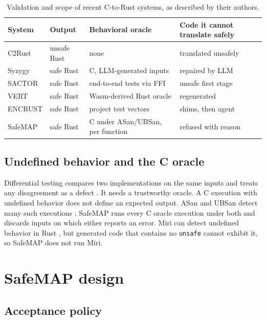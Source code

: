 \documentclass[pdflatex,sn-basic]{sn-jnl}
\newcommand{\tool}{SafeMAP\xspace}
\begin{document}
\begin{table}[t]
\centering
\caption{Validation and scope of recent C-to-Rust systems, as described by their authors.}
\label{tab:related}
\scriptsize
\begin{tabular}{@{}lp{1.3cm}p{3.2cm}p{2.9cm}@{}}
\toprule
System & Output & Behavioral oracle & Code it cannot translate safely \\
\midrule
C2Rust \citep{c2rust} & unsafe Rust & none & translated unsafely \\
Syzygy \citep{shetty2024syzygy} & safe Rust & C, LLM-generated inputs & repaired by LLM \\
SACTOR \citep{zhou2025sactor} & safe Rust & end-to-end tests via FFI & unsafe first stage \\
VERT \citep{yang2025vert} & safe Rust & Wasm-derived Rust oracle & regenerated \\
ENCRUST \citep{sim2026encrust} & safe Rust & project test vectors & shims, then agent \\
\tool & safe Rust & C under ASan/UBSan, per function & refused with reason \\
\bottomrule
\end{tabular}
\end{table}

\subsection{Undefined behavior and the C oracle}

Differential testing compares two implementations on the same inputs and
treats any disagreement as a defect \citep{mckeeman1998differential}. It needs
a trustworthy oracle. A C execution with undefined
behavior does not define an expected output. ASan and UBSan detect many such
executions \citep{serebryany2012asan,clangubsan}; \tool runs every C oracle
execution under both and discards inputs on which either reports an error.
Miri can detect undefined behavior in Rust \citep{jung2026miri}, but generated
code that contains no \texttt{unsafe} cannot exhibit it, so \tool does not run
Miri.

\section{SafeMAP design}

\subsection{Acceptance policy}
\label{sec:acceptance-policy}
\end{document}
